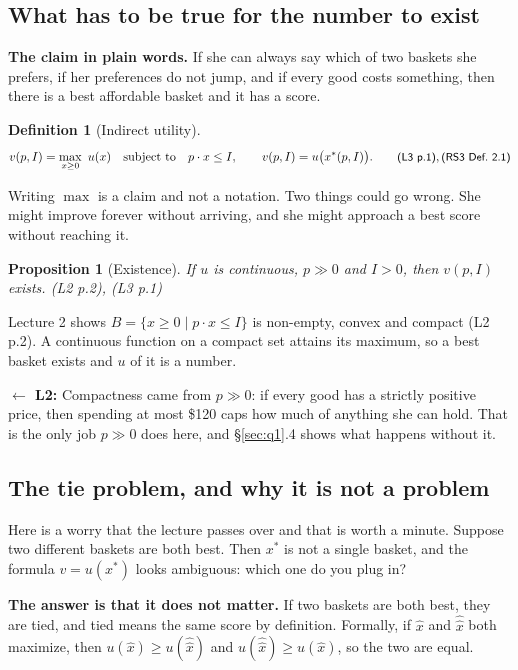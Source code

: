 \documentclass[11pt,letterpaper]{article}
\theoremstyle{definition}
\newtheorem{defn}{Definition}
\theoremstyle{plain}
\newtheorem{prop}{Proposition}
\newcommand{\src}[1]{{\small\textsf{(#1)}}}
\newcommand{\bwd}[1]{\textsf{\textbf{$\leftarrow$ #1:}}}
\newcommand{\skipnote}{\noindent{\small\textsf{Proof. Skippable on a first read.}}\par\smallskip}
\begin{document}
\subsection{What has to be true for the number to exist}

\textbf{The claim in plain words.} If she can always say which of two baskets she prefers, if her
preferences do not jump, and if every good costs something, then there is a best affordable basket
and it has a score.

\begin{defn}[Indirect utility]
\[
v(p,I) = \max_{x \ge 0} \ u(x) \quad \text{subject to} \quad p \cdot x \le I,
\qquad v(p,I) = u\big( x^*(p,I) \big). \qquad \src{L3 p.1}, \src{RS3 Def.\ 2.1}
\]
\end{defn}

Writing $\max$ is a claim and not a notation. Two things could go wrong. She might improve forever
without arriving, and she might approach a best score without reaching it.

\begin{prop}[Existence] If $u$ is continuous, $p \gg 0$ and $I > 0$, then $v(p,I)$ exists.
\src{L2 p.2}, \src{L3 p.1}
\end{prop}

\skipnote
\begin{leftbar}
\small
Lecture 2 shows $B = \{ x \ge 0 \mid p \cdot x \le I \}$ is non-empty, convex and compact
\src{L2 p.2}. A continuous function on a compact set attains its maximum, so a best basket exists
and $u$ of it is a number.
\end{leftbar}

\bwd{L2} Compactness came from $p \gg 0$: if every good has a strictly positive price, then spending
at most \$120 caps how much of anything she can hold. That is the only job $p \gg 0$ does here, and
\S\ref{sec:q1}.4 shows what happens without it.

\subsection{The tie problem, and why it is not a problem}

Here is a worry that the lecture passes over and that is worth a minute. Suppose two different
baskets are both best. Then $x^*$ is not a single basket, and the formula $v = u(x^*)$ looks
ambiguous: which one do you plug in?

\textbf{The answer is that it does not matter.} If two baskets are both best, they are tied, and tied
means the same score by definition. Formally, if $\hat x$ and $\hat{\hat x}$ both maximize, then
$u(\hat x) \ge u(\hat{\hat x})$ and $u(\hat{\hat x}) \ge u(\hat x)$, so the two are equal.
\end{document}
